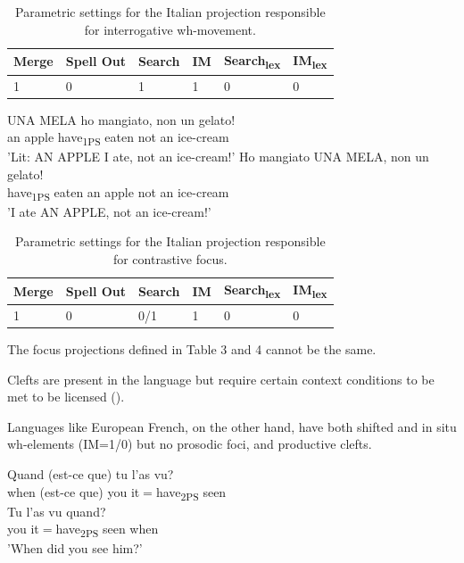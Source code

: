 \documentclass[fleqn,10pt]{wlscirep}
\begin{document}
\begin{table}[H]
    \centering
    \begin{tabular}{|l|l|l|l|l|l|}
    \hline
    Merge & Spell Out & Search & IM & Search\textsubscript{lex} & IM\textsubscript{lex} \\
    \hline
    1 & 0 & 1 & 1 & 0 & 0 \\
    \hline
    \end{tabular}
    \caption{\label{tab:samp}Parametric settings for the Italian projection responsible for interrogative wh-movement.}
\end{table}

\begin{exe}
    \ex
        \begin{xlist}
            \ex \gll UNA MELA ho mangiato, non un gelato!\\
            an apple have\textsubscript{1PS} eaten not an ice-cream\\
            \glt 'Lit: AN APPLE I ate, not an ice-cream!'
            \ex \gll Ho mangiato UNA MELA, non un gelato!\\
            have\textsubscript{1PS} eaten an apple not an ice-cream\\
            \glt 'I ate AN APPLE, not an ice-cream!'
        \end{xlist}
\end{exe}

\begin{table}[H]
    \centering
    \begin{tabular}{|l|l|l|l|l|l|}
    \hline
    Merge & Spell Out & Search & IM & Search\textsubscript{lex} & IM\textsubscript{lex} \\
    \hline
    1 & 0 & 0/1 & 1 & 0 & 0 \\
    \hline
    \end{tabular}
    \caption{\label{tab:samp}Parametric settings for the Italian projection responsible for contrastive focus.}
\end{table}

\noindent The focus projections defined in Table 3 and 4 cannot be the same.

\noindent Clefts are present in the language but require certain context conditions to be met to be licensed (\citealt{larrive2022}). 

\noindent Languages like European French, on the other hand, have both shifted and in situ wh-elements (IM=1/0) but no prosodic foci, and productive clefts. 

\begin{exe}
    \ex
        \begin{xlist}
            \ex  \gll Quand (est-ce que) tu l'as vu?\\
            when (est-ce que) you it$=$have\textsubscript{2PS} seen\\
            \ex  \gll Tu l'as vu quand?\\
            you it$=$have\textsubscript{2PS} seen when\\
            \glt 'When did you see him?'
        \end{xlist}
\end{exe}
\end{document}
